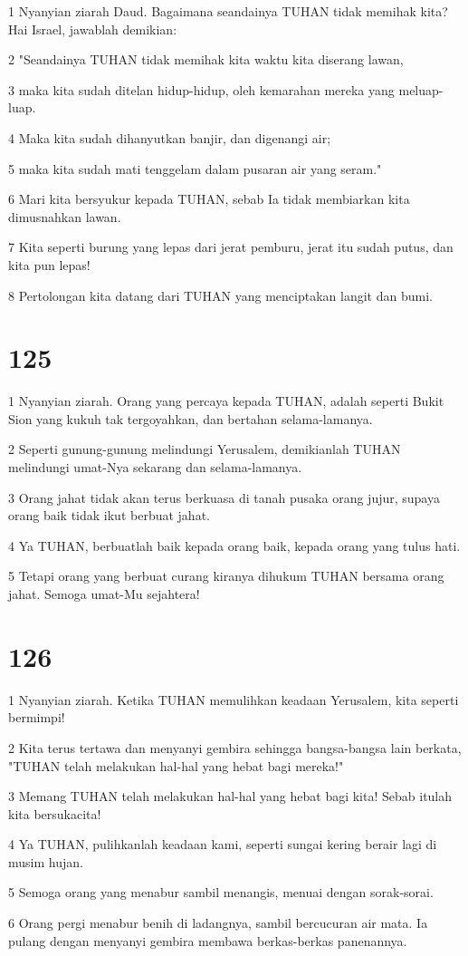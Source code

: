 \par 1 Nyanyian ziarah Daud. Bagaimana seandainya TUHAN tidak memihak kita? Hai Israel, jawablah demikian:
\par 2 "Seandainya TUHAN tidak memihak kita waktu kita diserang lawan,
\par 3 maka kita sudah ditelan hidup-hidup, oleh kemarahan mereka yang meluap-luap.
\par 4 Maka kita sudah dihanyutkan banjir, dan digenangi air;
\par 5 maka kita sudah mati tenggelam dalam pusaran air yang seram."
\par 6 Mari kita bersyukur kepada TUHAN, sebab Ia tidak membiarkan kita dimusnahkan lawan.
\par 7 Kita seperti burung yang lepas dari jerat pemburu, jerat itu sudah putus, dan kita pun lepas!
\par 8 Pertolongan kita datang dari TUHAN yang menciptakan langit dan bumi.

\chapter{125}

\par 1 Nyanyian ziarah. Orang yang percaya kepada TUHAN, adalah seperti Bukit Sion yang kukuh tak tergoyahkan, dan bertahan selama-lamanya.
\par 2 Seperti gunung-gunung melindungi Yerusalem, demikianlah TUHAN melindungi umat-Nya sekarang dan selama-lamanya.
\par 3 Orang jahat tidak akan terus berkuasa di tanah pusaka orang jujur, supaya orang baik tidak ikut berbuat jahat.
\par 4 Ya TUHAN, berbuatlah baik kepada orang baik, kepada orang yang tulus hati.
\par 5 Tetapi orang yang berbuat curang kiranya dihukum TUHAN bersama orang jahat. Semoga umat-Mu sejahtera!

\chapter{126}

\par 1 Nyanyian ziarah. Ketika TUHAN memulihkan keadaan Yerusalem, kita seperti bermimpi!
\par 2 Kita terus tertawa dan menyanyi gembira sehingga bangsa-bangsa lain berkata, "TUHAN telah melakukan hal-hal yang hebat bagi mereka!"
\par 3 Memang TUHAN telah melakukan hal-hal yang hebat bagi kita! Sebab itulah kita bersukacita!
\par 4 Ya TUHAN, pulihkanlah keadaan kami, seperti sungai kering berair lagi di musim hujan.
\par 5 Semoga orang yang menabur sambil menangis, menuai dengan sorak-sorai.
\par 6 Orang pergi menabur benih di ladangnya, sambil bercucuran air mata. Ia pulang dengan menyanyi gembira membawa berkas-berkas panenannya.

